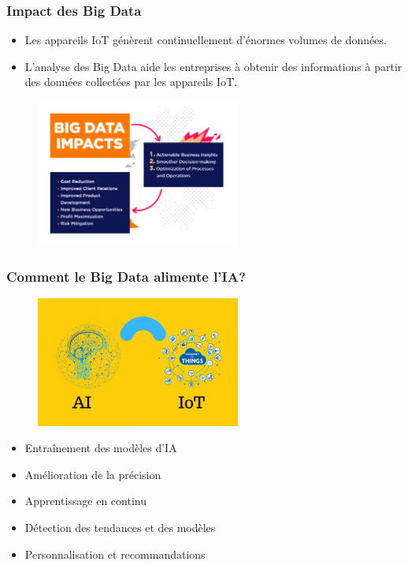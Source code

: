 \documentclass{beamer}
\begin{document}
\begin{frame}
	\frametitle{Impact des Big Data}
	
	\begin{itemize}
		\item Les appareils IoT génèrent continuellement d'énormes volumes de données.
\item L'analyse des Big Data aide les entreprises à obtenir des informations à partir des données collectées par les appareils IoT.
	\end{itemize}
	
	\begin{figure}
		\centering
		\includegraphics[width=0.6\textwidth]{big_data_benefits.jpg}
	\end{figure}
	
\end{frame}






	\begin{frame}
	\frametitle{Comment le Big Data alimente l'IA?}
		\begin{figure}
		\centering
		\includegraphics[width=0.6\textwidth]{ia-capteurs-iot.jpg}
	\end{figure}
	\begin{itemize}
		\item Entraînement des modèles d'IA
		\item Amélioration de la précision
		\item Apprentissage en continu
		\item Détection des tendances et des modèles
		\item Personnalisation et recommandations
	\end{itemize}
\end{frame}
\end{document}
